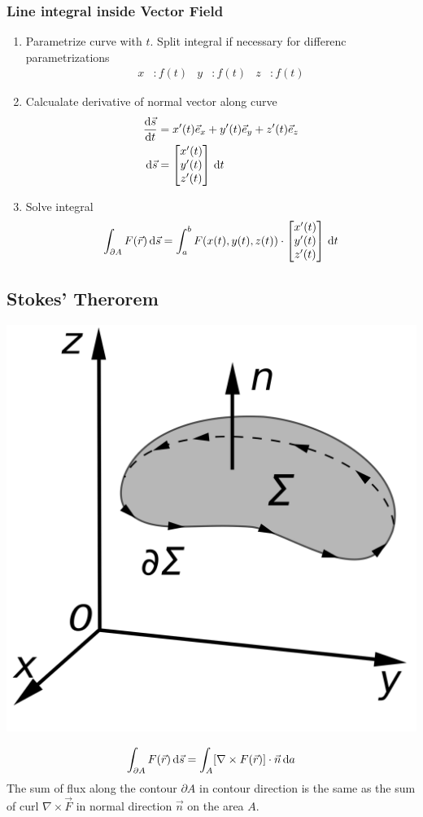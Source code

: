 \documentclass[a4paper, fontsize=8pt, landscape, DIV=1]{scrartcl}
\begin{document}
\begin{multicols*}{4}
    \subsubsection{Line integral inside Vector Field}
    \begin{enumerate}
      \item Parametrize curve with $t$. Split integral if necessary for differenc parametrizations
       \begin{align*} x&:f(t) & y&:f(t) & z&:f(t)\end{align*}
      \item Calcualate derivative of normal vector along curve
      \begin{align*}\frac{\mathrm{d}\vec{s}}{\mathrm{d}t} &= x'(t)\vec{e}_x+y'(t)\vec{e}_y+z'(t)\vec{e}_z \\ \,\mathrm{d} \vec{s} &= \displaystyle \left[ \begin{matrix} x'(t)\\y'(t)\\z'(t) \end{matrix} \right]\,\mathrm{d} t\end{align*}
      \item Solve integral
      \[ \int_{\partial A} F(\vec{r}) \,\mathrm{d} \vec{s} = \int^b_a F(x(t),y(t),z(t)) \cdot \displaystyle \left[ \begin{matrix} x'(t)\\y'(t)\\z'(t) \end{matrix} \right]\,\mathrm{d} t \]
    \end{enumerate}

    \subsection{Stokes' Therorem}
    \begin{center}\includegraphics[width=0.5\columnwidth,keepaspectratio]{img/stokes.png}\end{center}
    \[\int_{\partial A}F(\vec{r})\,\mathrm{d} \vec{s} = \int_A[\nabla\times F(\vec{r})]\cdot\vec{n}\,\mathrm{d} a\]
    The sum of flux along the contour $\partial A$ in contour direction is the same as the sum of curl $\nabla\times \vec{F}$ in normal direction $\vec{n}$ on the area $A$.


\end{multicols*}
\end{document}
